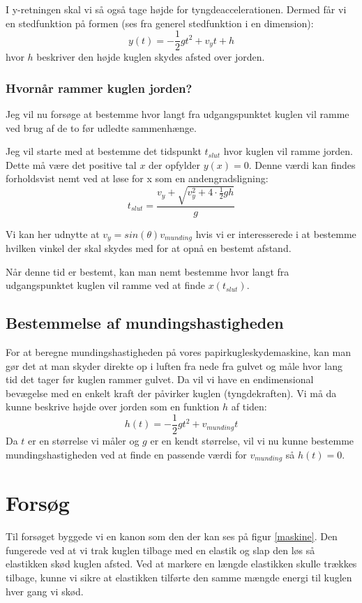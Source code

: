 \documentclass[12pt,a4paper]{article}
\theoremstyle{break}
\theoremstyle{nonumberplain}
\begin{document}
I y-retningen skal vi så også tage højde for tyngdeaccelerationen.
Dermed får vi en stedfunktion på formen (ses fra generel stedfunktion i en dimension): $$y(t)=-\frac{1}{2}gt^2+v_yt+h$$
hvor $h$ beskriver den højde kuglen skydes afsted over jorden.

\subsubsection{Hvornår rammer kuglen jorden?}
Jeg vil nu forsøge at bestemme hvor langt fra udgangspunktet kuglen vil ramme ved brug af de to før udledte sammenhænge.

Jeg vil starte med at bestemme det tidspunkt $t_{slut}$ hvor kuglen vil ramme jorden.
Dette må være det positive tal $x$ der opfylder $y(x)=0$. 
Denne værdi kan findes forholdsvist nemt ved at løse for x som en andengradsligning:
$$t_{slut} = \dfrac{v_y + \sqrt{v_y^2 + 4 \cdot \frac{1}{2}gh}}{g}$$

Vi kan her udnytte at $v_y = sin(\theta )v_{munding}$ hvis vi er interesserede i at bestemme hvilken vinkel der skal skydes med for at opnå en bestemt afstand.

Når denne tid er bestemt, kan man nemt bestemme hvor langt fra udgangspunktet kuglen vil ramme ved at finde $x(t_{slut})$.

\subsection{Bestemmelse af mundingshastigheden}
For at beregne mundingshastigheden på vores papirkugleskydemaskine, kan man gør det at man skyder direkte op i luften fra nede fra gulvet og måle hvor lang tid det tager før kuglen rammer gulvet.
Da vil vi have en endimensional bevægelse med en enkelt kraft der påvirker kuglen (tyngdekraften). 
Vi må da kunne beskrive højde over jorden som en funktion $h$ af tiden:
$$h(t)=-\frac{1}{2}gt^2 + v_{munding}t$$
Da $t$ er en størrelse vi måler og $g$ er en kendt størrelse, vil vi nu kunne bestemme mundingshastigheden ved at finde en passende værdi for $v_{munding}$ så $h(t)=0$.
\pagebreak
\section{Forsøg}
Til forsøget byggede vi en kanon som den der kan ses på figur \ref{maskine}. 
Den fungerede ved at vi trak kuglen tilbage med en elastik og slap den løs så elastikken skød kuglen afsted. 
Ved at markere en længde elastikken skulle trækkes tilbage, kunne vi sikre at elastikken tilførte den samme mængde energi til kuglen hver gang vi skød. 
\end{document}
